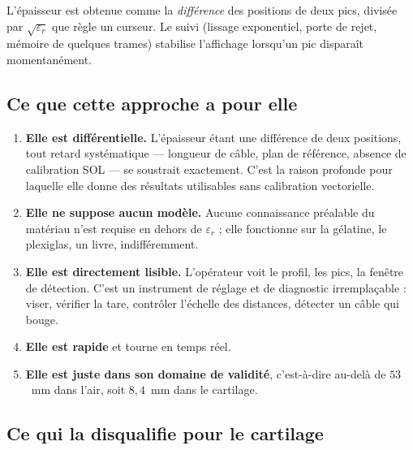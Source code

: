 \documentclass[11pt,a4paper]{article}
\newcommand{\eps}{\varepsilon_r}
\begin{document}
L'épaisseur est obtenue comme la \emph{différence} des positions de deux pics,
divisée par $\sqrt{\eps}$ que règle un curseur. Le suivi (lissage exponentiel,
porte de rejet, mémoire de quelques trames) stabilise l'affichage lorsqu'un pic
disparaît momentanément.

\subsection{Ce que cette approche a pour elle}

\begin{enumerate}
\item \textbf{Elle est différentielle.} L'épaisseur étant une différence de deux
      positions, tout retard systématique --- longueur de câble, plan de
      référence, absence de calibration SOL --- se soustrait exactement. C'est
      la raison profonde pour laquelle elle donne des résultats utilisables sans
      calibration vectorielle.
\item \textbf{Elle ne suppose aucun modèle.} Aucune connaissance préalable du
      matériau n'est requise en dehors de $\eps$ ; elle fonctionne sur la
      gélatine, le plexiglas, un livre, indifféremment.
\item \textbf{Elle est directement lisible.} L'opérateur voit le profil, les
      pics, la fenêtre de détection. C'est un instrument de réglage et de
      diagnostic irremplaçable : viser, vérifier la tare, contrôler l'échelle
      des distances, détecter un câble qui bouge.
\item \textbf{Elle est rapide} et tourne en temps réel.
\item \textbf{Elle est juste dans son domaine de validité}, c'est-à-dire
      au-delà de $53$~mm dans l'air, soit $8{,}4$~mm dans le cartilage.
\end{enumerate}

\subsection{Ce qui la disqualifie pour le cartilage}
\end{document}
